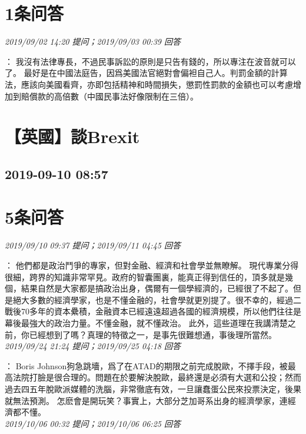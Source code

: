 \documentclass[twocolumn]{ctexart}
\begin{document}
\section{1条问答}

\textit{\hfill\noindent\small 2019/09/02 14:20 提问；2019/09/03 00:39 回答}

：
我沒有法律專長，不過民事訴訟的原則是只告有錢的，所以專注在波音就可以了。
最好是在中國法庭告，因爲美國法官絕對會偏袒自己人。判罰金額的計算法，應該向美國看齊，亦即包括精神和時間損失，懲罰性罰款的金額也可以考慮增加到賠償款的高倍數（中國民事法好像限制在三倍）。
\\


\section{【英國】談Brexit}
\subsection{2019-09-10 08:57}


\section{5条问答}

\textit{\hfill\noindent\small 2019/09/10 09:37 提问；2019/09/11 04:45 回答}

：
他們都是政治鬥爭的專家，但對金融、經濟和社會學並無瞭解。 
現代專業分得很細，跨界的知識非常罕見。政府的智囊團裏，能真正得到信任的，頂多就是幾個，結果自然是大家都是搞政治出身，偶爾有一個學經濟的，已經很了不起了。但是絕大多數的經濟學家，也是不懂金融的，社會學就更別提了。很不幸的，經過二戰後70多年的資本纍積，金融資本已經遠遠超過各國的經濟規模，所以他們往往是幕後最強大的政治力量。不懂金融，就不懂政治。 
此外，這些道理在我講清楚之前，你已經想到了嗎？真理的特徵之一，是事先很難想通，事後理所當然。
\\

\textit{\hfill\noindent\small 2019/09/24 21:24 提问；2019/09/25 04:18 回答}

：
Boris Johnson狗急跳墻，爲了在ATAD的期限之前完成脫歐，不擇手段，被最高法院打臉是很合理的。問題在於要解決脫歐，最終還是必須有大選和公投；然而過去四五年脫歐派媒體的洗腦，非常徹底有效，一旦讓蠢蛋公民來投票決定，後果就無法預測。
怎麽會是開玩笑？事實上，大部分芝加哥系出身的經濟學家，連經濟都不懂。
\\

\textit{\hfill\noindent\small 2019/10/06 00:32 提问；2019/10/06 06:25 回答}
\end{document}

